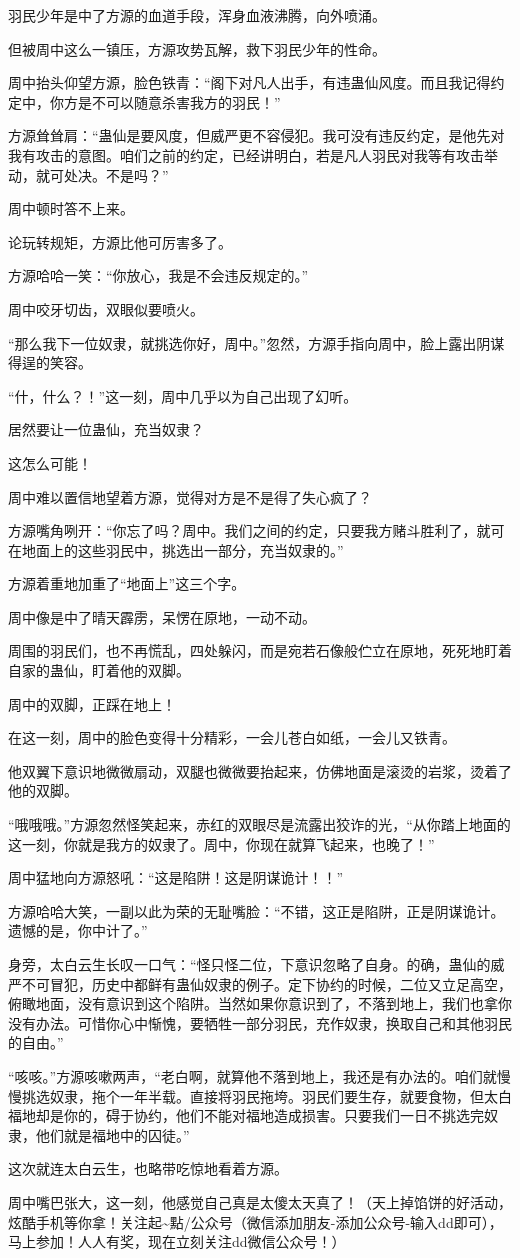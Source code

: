\begin{this_body}
羽民少年是中了方源的血道手段，浑身血液沸腾，向外喷涌。

但被周中这么一镇压，方源攻势瓦解，救下羽民少年的性命。

周中抬头仰望方源，脸色铁青：“阁下对凡人出手，有违蛊仙风度。而且我记得约定中，你方是不可以随意杀害我方的羽民！”

方源耸耸肩：“蛊仙是要风度，但威严更不容侵犯。我可没有违反约定，是他先对我有攻击的意图。咱们之前的约定，已经讲明白，若是凡人羽民对我等有攻击举动，就可处决。不是吗？”

周中顿时答不上来。

论玩转规矩，方源比他可厉害多了。

方源哈哈一笑：“你放心，我是不会违反规定的。”

周中咬牙切齿，双眼似要喷火。

“那么我下一位奴隶，就挑选你好，周中。”忽然，方源手指向周中，脸上露出阴谋得逞的笑容。

“什，什么？！”这一刻，周中几乎以为自己出现了幻听。

居然要让一位蛊仙，充当奴隶？

这怎么可能！

周中难以置信地望着方源，觉得对方是不是得了失心疯了？

方源嘴角咧开：“你忘了吗？周中。我们之间的约定，只要我方赌斗胜利了，就可在地面上的这些羽民中，挑选出一部分，充当奴隶的。”

方源着重地加重了“地面上”这三个字。

周中像是中了晴天霹雳，呆愣在原地，一动不动。

周围的羽民们，也不再慌乱，四处躲闪，而是宛若石像般伫立在原地，死死地盯着自家的蛊仙，盯着他的双脚。

周中的双脚，正踩在地上！

在这一刻，周中的脸色变得十分精彩，一会儿苍白如纸，一会儿又铁青。

他双翼下意识地微微扇动，双腿也微微要抬起来，仿佛地面是滚烫的岩浆，烫着了他的双脚。

“哦哦哦。”方源忽然怪笑起来，赤红的双眼尽是流露出狡诈的光，“从你踏上地面的这一刻，你就是我方的奴隶了。周中，你现在就算飞起来，也晚了！”

周中猛地向方源怒吼：“这是陷阱！这是阴谋诡计！！”

方源哈哈大笑，一副以此为荣的无耻嘴脸：“不错，这正是陷阱，正是阴谋诡计。遗憾的是，你中计了。”

身旁，太白云生长叹一口气：“怪只怪二位，下意识忽略了自身。的确，蛊仙的威严不可冒犯，历史中都鲜有蛊仙奴隶的例子。定下协约的时候，二位又立足高空，俯瞰地面，没有意识到这个陷阱。当然如果你意识到了，不落到地上，我们也拿你没有办法。可惜你心中惭愧，要牺牲一部分羽民，充作奴隶，换取自己和其他羽民的自由。”

“咳咳。”方源咳嗽两声，“老白啊，就算他不落到地上，我还是有办法的。咱们就慢慢挑选奴隶，拖个一年半载。直接将羽民拖垮。羽民们要生存，就要食物，但太白福地却是你的，碍于协约，他们不能对福地造成损害。只要我们一日不挑选完奴隶，他们就是福地中的囚徒。”

这次就连太白云生，也略带吃惊地看着方源。

周中嘴巴张大，这一刻，他感觉自己真是太傻太天真了！（天上掉馅饼的好活动，炫酷手机等你拿！关注起\~{}點/公众号（微信添加朋友-添加公众号-输入dd即可），马上参加！人人有奖，现在立刻关注dd微信公众号！）

\end{this_body}

